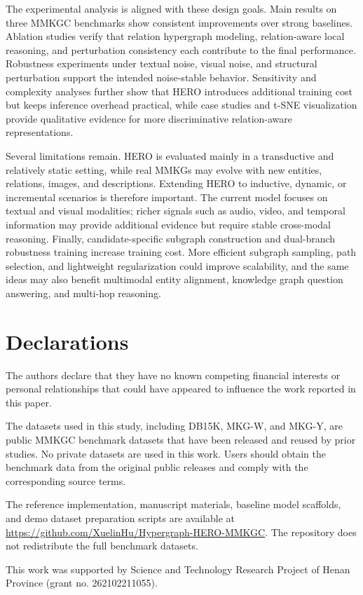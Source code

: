 \documentclass[pdflatex,sn-mathphys-num]{sn-jnl}
\begin{document}
The experimental analysis is aligned with these design goals. Main results on three MMKGC benchmarks show consistent improvements over strong baselines. Ablation studies verify that relation hypergraph modeling, relation-aware local reasoning, and perturbation consistency each contribute to the final performance. Robustness experiments under textual noise, visual noise, and structural perturbation support the intended noise-stable behavior. Sensitivity and complexity analyses further show that HERO introduces additional training cost but keeps inference overhead practical, while case studies and t-SNE visualization provide qualitative evidence for more discriminative relation-aware representations.

Several limitations remain. HERO is evaluated mainly in a transductive and relatively static setting, while real MMKGs may evolve with new entities, relations, images, and descriptions. Extending HERO to inductive, dynamic, or incremental scenarios is therefore important. The current model focuses on textual and visual modalities; richer signals such as audio, video, and temporal information may provide additional evidence but require stable cross-modal reasoning. Finally, candidate-specific subgraph construction and dual-branch robustness training increase training cost. More efficient subgraph sampling, path selection, and lightweight regularization could improve scalability, and the same ideas may also benefit multimodal entity alignment, knowledge graph question answering, and multi-hop reasoning.



\section*{Declarations}

The authors declare that they have no known competing financial
interests or personal relationships that could have appeared to influence
the work reported in this paper.


The datasets used in this study, including DB15K, MKG-W, and MKG-Y, are public MMKGC benchmark datasets that have been released and reused by prior studies. No private datasets are used in this work. Users should obtain the benchmark data from the original public releases and comply with the corresponding source terms.


The reference implementation, manuscript materials, baseline model scaffolds, and demo dataset preparation scripts are available at \url{https://github.com/XuelinHu/Hypergraph-HERO-MMKGC}. The repository does not redistribute the full benchmark datasets.


This work was supported by Science and Technology Research Project of Henan Province (grant no. 262102211055).


\end{document}

